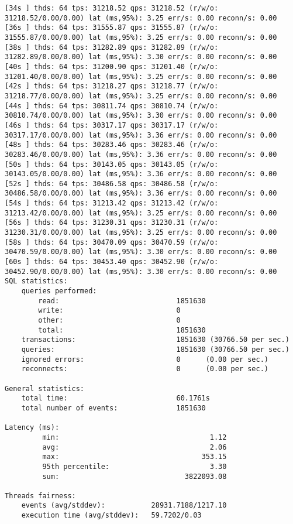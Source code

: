\documentclass{article}
\begin{document}
\begin{verbatim}
[34s ] thds: 64 tps: 31218.52 qps: 31218.52 (r/w/o: 31218.52/0.00/0.00) lat (ms,95%): 3.25 err/s: 0.00 reconn/s: 0.00
[36s ] thds: 64 tps: 31555.87 qps: 31555.87 (r/w/o: 31555.87/0.00/0.00) lat (ms,95%): 3.25 err/s: 0.00 reconn/s: 0.00
[38s ] thds: 64 tps: 31282.89 qps: 31282.89 (r/w/o: 31282.89/0.00/0.00) lat (ms,95%): 3.30 err/s: 0.00 reconn/s: 0.00
[40s ] thds: 64 tps: 31200.90 qps: 31201.40 (r/w/o: 31201.40/0.00/0.00) lat (ms,95%): 3.25 err/s: 0.00 reconn/s: 0.00
[42s ] thds: 64 tps: 31218.27 qps: 31218.77 (r/w/o: 31218.77/0.00/0.00) lat (ms,95%): 3.25 err/s: 0.00 reconn/s: 0.00
[44s ] thds: 64 tps: 30811.74 qps: 30810.74 (r/w/o: 30810.74/0.00/0.00) lat (ms,95%): 3.30 err/s: 0.00 reconn/s: 0.00
[46s ] thds: 64 tps: 30317.17 qps: 30317.17 (r/w/o: 30317.17/0.00/0.00) lat (ms,95%): 3.36 err/s: 0.00 reconn/s: 0.00
[48s ] thds: 64 tps: 30283.46 qps: 30283.46 (r/w/o: 30283.46/0.00/0.00) lat (ms,95%): 3.36 err/s: 0.00 reconn/s: 0.00
[50s ] thds: 64 tps: 30143.05 qps: 30143.05 (r/w/o: 30143.05/0.00/0.00) lat (ms,95%): 3.36 err/s: 0.00 reconn/s: 0.00
[52s ] thds: 64 tps: 30486.58 qps: 30486.58 (r/w/o: 30486.58/0.00/0.00) lat (ms,95%): 3.36 err/s: 0.00 reconn/s: 0.00
[54s ] thds: 64 tps: 31213.42 qps: 31213.42 (r/w/o: 31213.42/0.00/0.00) lat (ms,95%): 3.25 err/s: 0.00 reconn/s: 0.00
[56s ] thds: 64 tps: 31230.31 qps: 31230.31 (r/w/o: 31230.31/0.00/0.00) lat (ms,95%): 3.25 err/s: 0.00 reconn/s: 0.00
[58s ] thds: 64 tps: 30470.09 qps: 30470.59 (r/w/o: 30470.59/0.00/0.00) lat (ms,95%): 3.30 err/s: 0.00 reconn/s: 0.00
[60s ] thds: 64 tps: 30453.40 qps: 30452.90 (r/w/o: 30452.90/0.00/0.00) lat (ms,95%): 3.30 err/s: 0.00 reconn/s: 0.00
SQL statistics:
    queries performed:
        read:                            1851630
        write:                           0
        other:                           0
        total:                           1851630
    transactions:                        1851630 (30766.50 per sec.)
    queries:                             1851630 (30766.50 per sec.)
    ignored errors:                      0      (0.00 per sec.)
    reconnects:                          0      (0.00 per sec.)

General statistics:
    total time:                          60.1761s
    total number of events:              1851630

Latency (ms):
         min:                                    1.12
         avg:                                    2.06
         max:                                  353.15
         95th percentile:                        3.30
         sum:                              3822093.08

Threads fairness:
    events (avg/stddev):           28931.7188/1217.10
    execution time (avg/stddev):   59.7202/0.03
\end{verbatim}
\end{document}
